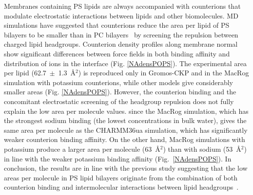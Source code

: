 \documentclass[aps,prl,superscriptaddress,twocolumn]{revtex4}
\begin{document}
Membranes containing PS lipids are always accompanied with counterions that
modulate electrostatic interactions between lipids and other biomolecules. MD simulations have suggested
that counterions reduce the area per lipid of PS bilayers to be smaller than in PC
bilayers~\cite{pandit02,mukhopadhyay04,pedersen06} by screening the repulsion between charged lipid headgroups. 
Counterion density profiles along membrane normal 
show significant differences between force fields in both binding affinity
and distribution of ions in the interface (Fig. \ref{NAdensPOPS}).
The experimental area per lipid (62.7~$\pm$~1.3~\AA$^2$) \cite{pan14} 
is reproduced only in Gromos-CKP and in the MacRog simulation
with potassium counterions, while other models give considerably smaller areas (Fig. \ref{NAdensPOPS}).
However, the counterion binding and the concomitant electrostatic screening of the headgroup
repulsion does not fully explain the low area per molecule values.
since the MacRog simulation, which has the strongest sodium binding
(the lowest concentrations in bulk water), gives the same area per molecule
as the CHARMM36ua simulation, which has significantly weaker counterion binding
affinity. On the other hand, MacRog simulations with potassium produce a larger area per molecule (63~\AA$^2$) than
with sodium (53~\AA$^2$) in line with the weaker potassium binding affinity (Fig.~\ref{NAdensPOPS}).
In conclusion, the results are in line with the previous study suggesting that the
low areas per molecule in PS lipid bilayers originate from the combination
of both counterion binding and intermolecular interactions between lipid headgroups~\cite{petrache04}.
\end{document}
